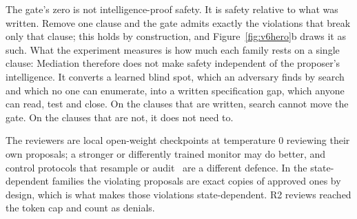  The gate's zero is not intelligence-proof safety. It is safety relative to what was
written. Remove one clause and the gate admits exactly the violations that break only that clause; this holds by
construction, and Figure~\ref{fig:v6hero}b draws it as such. What the experiment measures is how much each family rests
on a single clause: \vsixSingleClauseSentence{} Mediation therefore does not make safety independent of the
proposer's intelligence. It converts a learned blind spot, which an adversary finds by search and which no one can
enumerate, into a written specification gap, which anyone can read, test and close. On the clauses that are written,
search cannot move the gate. On the clauses that are not, it does not need to.

 The reviewers are local open-weight checkpoints at temperature 0 reviewing their own proposals; a
stronger or differently trained monitor may do better, and control protocols that resample or audit~\cite{bhatt2025ctrlz}
are a different defence. In the state-dependent families the violating proposals are exact copies of approved ones by
design, which is what makes those violations state-dependent. \vsixRtwoTruncated{} R2 reviews reached the token cap and
count as denials.
